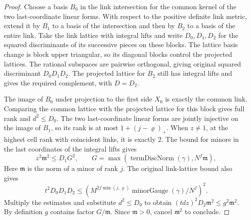 \begin{proof}
Choose a basis $B_0$ in the link intersection for the common kernel of the two last-coordinate linear forms. With respect to the positive definite link metric, extend it by $B_1$ to a basis of the intersection and then by $B_2$ to a basis of the entire link. Take the link lattice with integral lifts and write $D_0,D_1,D_2$ for the squared discriminants of its successive pieces on these blocks. The lattice basis change is block upper triangular, so its diagonal blocks control the projected lattices. The rational subspaces are pairwise orthogonal, giving original squared discriminant $D_0D_1D_2$. The projected lattice for $B_2$ still has integral lifts and gives the required complement, with $D=D_2$.

The image of $B_0$ under projection to the first side $X_0$ is exactly the common link. Comparing the common lattice with the projected lattice for this block gives full rank and $d^2\le D_0$. The two last-coordinate linear forms are jointly injective on the image of $B_1$, so its rank is at most $1+(j-\varrho)_+$. When $z\ne1$, at the highest cell rank with coincident links, it is exactly $2$. The bound for minors in the last coordinates of the integral lifts gives
\[
 z^2\mathfrak m^2\le D_1G^2,\qquad
 G=\max(\operatorname{termDiscNorm}(\gamma),N^f\mathfrak m),
\]
Here $\mathfrak m$ is the norm of a minor of rank $j$. The original link-lattice bound also gives
\[
 t^2D_0D_1D_2\le
 \left(M^{2f\min(j,\varrho)}\operatorname{minorGauge}(\gamma)/N^f\right)^2 .
\]
Multiply the estimates and substitute $d^2\le D_0$ to obtain $(tdz)^2D_2\mathfrak m^2\le g^2\mathfrak m^2$. By definition $g$ contains factor $G/\mathfrak m$. Since $\mathfrak m>0$, cancel $\mathfrak m^2$ to conclude.
\end{proof}

